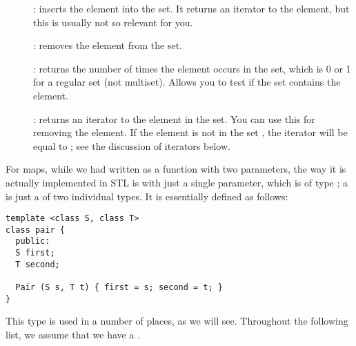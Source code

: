 \begin{description}
\item[]: inserts the element into the set. It
  returns an iterator to the element, but this is usually not so
  relevant for you.
\item[]: removes the element from the set.
\item[]: returns the number of times
  the element occurs in the set, which is 0 or 1 for a regular set
  (not multiset). Allows you to test if the set contains the element.
\item[]: returns an iterator to the
  element in the set. You can use this for removing the element. If
  the element is not in the set , the iterator will be equal
  to ; see the discussion of iterators below.
\end{description}

For maps, while we had written  as a function with two parameters,
the way it is actually implemented in STL is with just a single
parameter, which is of type ; a  is just a
 of two individual types. It is essentially defined as follows:

\begin{verbatim}
template <class S, class T>
class pair {
  public:
  S first;
  T second;

  Pair (S s, T t) { first = s; second = t; }
}
\end{verbatim}

This type is used in a number of places, as we will see. Throughout
the following list, we assume that we have a .

